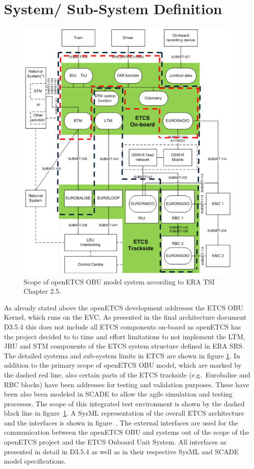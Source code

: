 \documentclass{template/openetcs_report}
\begin{document}
\section{System/ Sub-System Definition}

\begin{figure}[htbp]
\centering
\includegraphics[width=.75\textwidth]{images/ArchitectureSRS}
\caption[]{Scope of openETCS OBU model system according to ERA TSI Chapter 2.5.}
\label{f:architecture_srs}
\end{figure}

As already stated above the openETCS development addresses the ETCS OBU Kernel, which runs on the EVC. 
As presented in the final architecture document D3.5.4 this does not include all ETCS components on-board as openETCS has the project decided to to time and effort limitations to not implement the LTM, JRU and STM components of the ETCS system structure defined in ERA SRS. The detailed systema and sub-system limits in ETCS are shown in figure \ref{f:architecture_srs}. In addition to the primary scope of openETCS OBU model, which are marked by the dashed red line, also certain parts of the ETCS trackside (e.g.~Eurobalise and RBC blocks) have been addresses for testing and validation purposes. These have been also been modeled in SCADE to allow the agile simulation and testing processes.  The scope of this integrated test environment is shown by the dashed black line in figure~\ref{f:architecture_srs}. A SysML representation of the overall ETCS architecture and the interfaces is shown in figure~\label{f:top_level}. The external interfaces are used for the communication between the openETCS OBU and systems out of the scope of the openETCS project and the ETCS Onboard Unit System. All interfaces as presented in detail in D3.5.4 as well as in their respective SysML and SCADE model specifications. 
\end{document}

